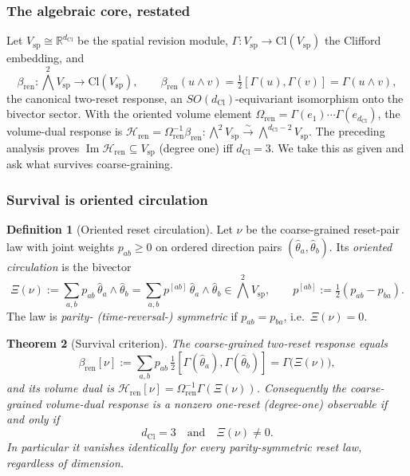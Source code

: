 \documentclass[11pt]{article}
\newtheorem{theorem}{Theorem}[section]
\theoremstyle{definition}
\newtheorem{definition}[theorem]{Definition}
\theoremstyle{remark}
\newcommand{\R}{\mathbb{R}}
\newcommand{\Cl}{\mathrm{Cl}}
\newcommand{\dCl}{d_{\mathrm{Cl}}}
\newcommand{\Vsp}{V_{\mathrm{sp}}}
\newcommand{\Img}{\operatorname{Im}}
\newcommand{\Volr}{\Omega_{\mathrm{ren}}}
\newcommand{\Hren}{\mathcal{H}_{\mathrm{ren}}}
\newcommand{\bren}{\beta_{\mathrm{ren}}}
\begin{document}
\subsubsection{The algebraic core, restated}

Let $\Vsp\cong\R^{\dCl}$ be the spatial revision module, $\Gamma:\Vsp\to\Cl(\Vsp)$
the Clifford embedding, and
\[
  \bren:\textstyle\bigwedge^2\Vsp\to\Cl(\Vsp),\qquad
  \bren(u\wedge v)=\tfrac12[\Gamma(u),\Gamma(v)]=\Gamma(u\wedge v),
\]
the canonical two-reset response, an $SO(\dCl)$-equivariant isomorphism onto the
bivector sector.  With the oriented volume element $\Volr=\Gamma(e_1)\cdots
\Gamma(e_{\dCl})$, the volume-dual response is
$\Hren=\Volr^{-1}\bren:\bigwedge^2\Vsp\xrightarrow{\sim}\bigwedge^{\dCl-2}\Vsp$.
The preceding analysis proves $\Img\Hren\subseteq\Vsp$ \textup{(}degree one\textup{)} iff
$\dCl=3$.  We take this as given and ask what survives coarse-graining.

\subsubsection{Survival is oriented circulation}

\begin{definition}[Oriented reset circulation]
\label{def:circulation}
Let $\nu$ be the coarse-grained reset-pair law with joint weights $p_{ab}\ge0$ on
ordered direction pairs $(\hat\theta_a,\hat\theta_b)$.  Its \emph{oriented
circulation} is the bivector
\[
  \Xi(\nu):=\sum_{a,b}p_{ab}\,\hat\theta_a\wedge\hat\theta_b
          =\sum_{a,b}p^{[ab]}\,\hat\theta_a\wedge\hat\theta_b
          \in\textstyle\bigwedge^2\Vsp,
  \qquad p^{[ab]}:=\tfrac12(p_{ab}-p_{ba}).
\]
The law is \emph{parity- (time-reversal-) symmetric} if $p_{ab}=p_{ba}$, i.e.\
$\Xi(\nu)=0$.
\end{definition}

\begin{theorem}[Survival criterion]
\label{thm:survival-criterion}
The coarse-grained two-reset response equals
\[
  \bren[\nu]:=\sum_{a,b}p_{ab}\,\tfrac12[\Gamma(\hat\theta_a),\Gamma(\hat\theta_b)]
  =\Gamma\bigl(\Xi(\nu)\bigr),
\]
and its volume dual is $\Hren[\nu]=\Volr^{-1}\Gamma(\Xi(\nu))$.  Consequently the
coarse-grained volume-dual response is a \emph{nonzero one-reset
\textup{(}degree-one\textup{)} observable} if and only if
\[
  \boxed{\ \dCl=3\quad\text{and}\quad \Xi(\nu)\neq0.\ }
\]
In particular it vanishes identically for every parity-symmetric reset law,
regardless of dimension.
\end{theorem}
\end{document}
